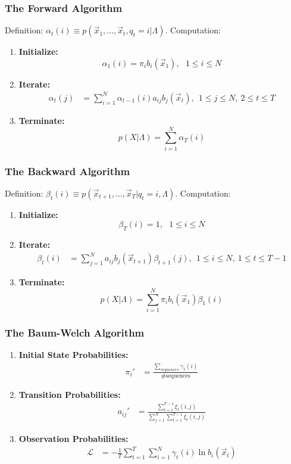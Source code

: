 \documentclass{beamer}
\begin{document}
\begin{frame}
  \frametitle{The Forward Algorithm}

  Definition: $\alpha_t(i) \equiv p(\vec{x}_1,\ldots,\vec{x}_t,q_t=i|\Lambda)$.  Computation:
  \begin{enumerate}
  \item {\bf Initialize:}
    \[
    \alpha_1(i) = \pi_i b_i(\vec{x}_1),~~~1\le i\le N
    \]
  \item {\bf Iterate:}
    \begin{align*}
      \alpha_{t}(j) &= \sum_{i=1}^N \alpha_{t-1}(i) a_{ij}b_j(\vec{x}_t),~~1\le j\le N,~2\le t\le T
    \end{align*}
  \item {\bf Terminate:}
    \[
    p(X|\Lambda) = \sum_{i=1}^N \alpha_T(i)
    \]
  \end{enumerate}
\end{frame}
  
\begin{frame}
  \frametitle{The Backward Algorithm}

  Definition: $\beta_t(i) \equiv p(\vec{x}_{t+1},\ldots,\vec{x}_T|q_t=i,\Lambda)$.  Computation:
  \begin{enumerate}
  \item {\bf Initialize:}
    \[
    \beta_T(i) = 1,~~~1\le i\le N
    \]
  \item {\bf Iterate:}
    \begin{align*}
      \beta_{t}(i) &= \sum_{j=1}^N a_{ij}b_j(\vec{x}_{t+1})\beta_{t+1}(j),~~1\le i\le N,~1\le t\le T-1
    \end{align*}
  \item {\bf Terminate:}
    \[
    p(X|\Lambda) = \sum_{i=1}^N \pi_ib_i(\vec{x}_1)\beta_1(i)
    \]
  \end{enumerate}
\end{frame}

\begin{frame}
  \frametitle{The Baum-Welch Algorithm}

  \begin{enumerate}
  \item {\bf Initial State Probabilities:}
    \begin{align*}
      \pi_i' &=\frac{\sum_{sequences} \gamma_1(i)}{\mbox{\# sequences}}
    \end{align*}
  \item {\bf Transition Probabilities:}
    \begin{align*}
      a_{ij}' &=\frac{\sum_{t=1}^{T-1} \xi_t(i,j)}{\sum_{j=1}^N\sum_{t=1}^{T-1}\xi_t(i,j)}
    \end{align*}
  \item {\bf Observation Probabilities:} 
    \begin{align*}
      {\mathcal L} &= -\frac{1}{T}\sum_{t=1}^T\sum_{i=1}^N  \gamma_t(i)\ln b_{i}(\vec{x}_t)
    \end{align*}
  \end{enumerate}
\end{frame}
\end{document}
